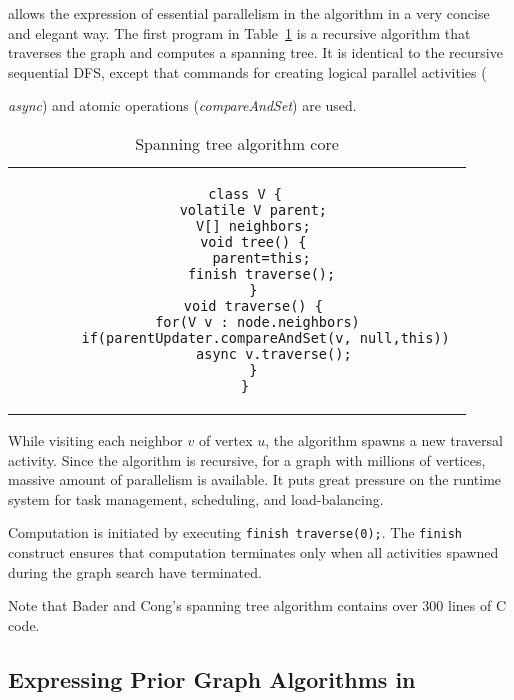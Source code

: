 \Xten{} allows the expression of essential parallelism in the
algorithm in a very concise and elegant way. The first program in
Table~\ref{alg:st-x10} is a recursive algorithm that traverses the
graph and computes a spanning tree. It is identical to the recursive
sequential DFS, except that commands for creating logical
parallel activities ({\emph{async}) and atomic operations
(\emph{compareAndSet}) are used.

\begin{table}
\centering
\scriptsize
\begin{tabular}{c}
\begin{minipage}[t]{0.5\textwidth}
\begin{verbatim} 
  class V {
    volatile V parent;
    V[] neighbors;
    void tree() {
      parent=this;
      finish traverse();
    }
    void traverse() {
      for(V v : node.neighbors) 
        if(parentUpdater.compareAndSet(v, null,this)) 
         async v.traverse();
    }
  }
\end{verbatim}
\end{minipage} 
\end{tabular}
\caption{Spanning tree algorithm core}
\label{alg:st-x10}
\end{table}

While visiting each neighbor $v$ of vertex $u$, the algorithm spawns a
new traversal activity. Since the algorithm is recursive, for a graph
with millions of vertices, massive amount of parallelism is
available. It puts great pressure on the runtime system for task
management, scheduling, and load-balancing. 

Computation is initiated by executing {\tt finish traverse(0);}. The {\tt finish} construct ensures that computation terminates only when all activities spawned during the graph search have terminated.


Note that Bader and Cong's spanning tree algorithm contains over 300 lines of C code.

\subsection{Expressing Prior Graph Algorithms in \Xten{}}

}
